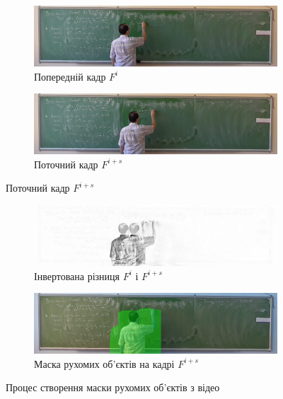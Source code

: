 \begin{figure}[H]
	\centering
	\begin{subfigure}[b]{0.55\textwidth}
		\centering
		\includegraphics[width=\textwidth]{images/prev_frame}
		\caption{Попередній кадр $F^i$
			\label{fig:yakovlev:bk_examples:a}
		}
	\end{subfigure}
	
	\begin{subfigure}[b]{0.55\textwidth}
		\centering
		\includegraphics[width=\textwidth]{images/next_frame}
		\caption{Поточний кадр $F^{i+s}$
			\label{fig:yakovlev:bk_examples:b}
		}
	\end{subfigure}
\end{figure}
\begin{figure}[H]
	\centering
	\ContinuedFloat
	\begin{subfigure}[b]{0.55\textwidth}
		\centering
		\includegraphics[width=\textwidth]{images/inv_diff}
		\caption{Інвертована різниця $F^i$ і $F^{i+s}$
			\label{fig:yakovlev:bk_examples:c}
		}
	\end{subfigure}
	
	\begin{subfigure}[b]{0.55\textwidth}
		\centering
		\includegraphics[width=\textwidth]{images/next_with_mask}
		\caption{Маска рухомих об'єктів на кадрі $F^{i+s}$
			\label{fig:yakovlev:bk_examples:d}
		}
	\end{subfigure}
	
	\caption{Процес створення маски рухомих об'єктів з відео \cite{yakovlev_discrete_math_video}
		\label{fig:yakovlev:bk_examples}
	}
\end{figure}


